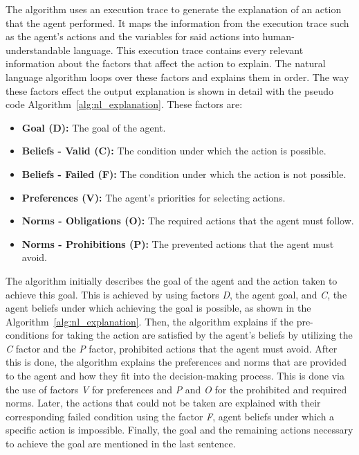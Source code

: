 \documentclass[sigconf,nonacm]{acmart}
\begin{document}
The algorithm uses an execution trace to generate the explanation of an action that the agent performed. It maps the information from the execution trace such as the agent's actions and the variables for said actions into human-understandable language. This execution trace contains every relevant information about the factors that affect the action to explain. The natural language algorithm loops over these factors and explains them in order. The way these factors effect the output explanation is shown in detail with the pseudo code Algorithm~\ref{alg:nl_explanation}. These factors are:

\begin{itemize}
    \item \textbf{Goal (D):} The goal of the agent.
    \item \textbf{Beliefs - Valid (C):} The condition under which the action is possible.
    \item \textbf{Beliefs - Failed (F):} The condition under which the action is not possible.
    \item \textbf{Preferences (V):} The agent's priorities for selecting actions.
    \item \textbf{Norms - Obligations (O):} The required actions that the agent must follow.
    \item \textbf{Norms - Prohibitions (P):} The prevented actions that the agent must avoid.
\end{itemize}




The algorithm initially describes the goal of the agent and the action taken to achieve this goal. This is achieved by using factors \textit{D}, the agent goal, and \textit{C}, the agent beliefs under which achieving the goal is possible, as shown in the Algorithm~\ref{alg:nl_explanation}. Then, the algorithm explains if the pre-conditions for taking the action are satisfied by the agent's beliefs by utilizing the \textit{C} factor and the \textit{P} factor, prohibited actions that the agent must avoid. After this is done, the algorithm explains the preferences and norms that are provided to the agent and how they fit into the decision-making process. This is done via the use of factors \textit{V} for preferences and \textit{P} and \textit{O} for the prohibited and required norms. Later, the actions that could not be taken are explained with their corresponding failed condition using the factor \textit{F}, agent beliefs under which a specific action is impossible. Finally, the goal and the remaining actions necessary to achieve the goal are mentioned in the last sentence.
\end{document}
